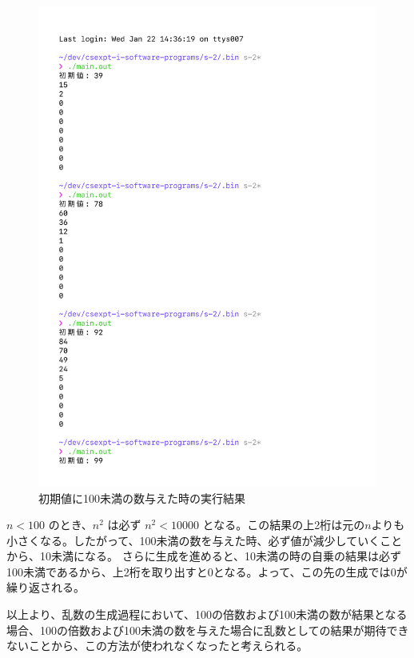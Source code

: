 \begin{figure}[H]
    \ContinuedFloat
    \centering
    \includegraphics[width=0.8\hsize, pagebox=mediabox, page=2]{main_result3_img.pdf}
    \caption{初期値に100未満の数与えた時の実行結果}
    \label{初期値に100未満の数与えた時の実行結果}
\end{figure}

$n < 100$ のとき、$n^2$ は必ず $n^2 < 10000$ となる。この結果の上2桁は元の$n$よりも小さくなる。したがって、100未満の数を与えた時、必ず値が減少していくことから、10未満になる。
さらに生成を進めると、10未満の時の自乗の結果は必ず100未満であるから、上2桁を取り出すと$0$となる。よって、この先の生成では$0$が繰り返される。

以上より、乱数の生成過程において、100の倍数および100未満の数が結果となる場合、100の倍数および100未満の数を与えた場合に乱数としての結果が期待できないことから、この方法が使われなくなったと考えられる。
